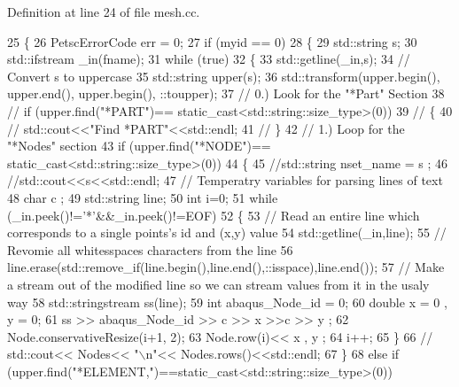 Definition at line 24 of file mesh.\+cc.


\begin{DoxyCode}
25 \{
26   PetscErrorCode err = 0;
27   \textcolor{keywordflow}{if} (myid == 0)
28   \{
29     std::string s;
30     std::ifstream \_in(fname);
31     \textcolor{keywordflow}{while} (\textcolor{keyword}{true})
32     \{
33       std::getline(\_in,s);
34       \textcolor{comment}{// Convert s to uppercase}
35       std::string upper(s);
36       std::transform(upper.begin(), upper.end(), upper.begin(), ::toupper);
37       \textcolor{comment}{// 0.) Look for the "*Part" Section}
38 \textcolor{comment}{//      if (upper.find("*PART")== static\_cast<std::string::size\_type>(0))}
39 \textcolor{comment}{//      \{}
40 \textcolor{comment}{//        std::cout<<"Find *PART"<<std::endl;}
41 \textcolor{comment}{//      \}}
42       \textcolor{comment}{// 1.) Loop for the "*Nodes" section}
43       \textcolor{keywordflow}{if} (upper.find(\textcolor{stringliteral}{"*NODE"})== \textcolor{keyword}{static\_cast<}std::string::size\_type\textcolor{keyword}{>}(0))
44       \{
45         \textcolor{comment}{//std::string nset\_name = s ;}
46         \textcolor{comment}{//std::cout<<s<<std::endl;}
47         \textcolor{comment}{// Temperatry variables for parsing lines of text}
48         \textcolor{keywordtype}{char} c ;
49         std::string line;
50         \textcolor{keywordtype}{int} i=0;
51         \textcolor{keywordflow}{while} (\_in.peek()!=\textcolor{charliteral}{'*'}&&\_in.peek()!=EOF)
52         \{
53           \textcolor{comment}{// Read an entire line which corresponds to a single points's id and (x,y) value}
54           std::getline(\_in,line);
55           \textcolor{comment}{// Revomie all whitesspaces characters from the line}
56           line.erase(std::remove\_if(line.begin(),line.end(),::isspace),line.end());
57           \textcolor{comment}{// Make a stream out of the modified line so we can stream values from it in the usaly way}
58           std::stringstream ss(line);
59           \textcolor{keywordtype}{int} abaqus\_Node\_id = 0;
60           \textcolor{keywordtype}{double} x = 0 , y = 0;
61           ss >> abaqus\_Node\_id >> c >> x >>c >> y ;
62           Node.conservativeResize(i+1, 2);
63           Node.row(i)<< x , y ;
64           i++;
65         \}
66         \textcolor{comment}{//  std::cout<< Nodes<< "\(\backslash\)n"<< Nodes.rows()<<std::endl;}
67       \}
68       \textcolor{keywordflow}{else} \textcolor{keywordflow}{if} (upper.find(\textcolor{stringliteral}{"*ELEMENT,"})==\textcolor{keyword}{static\_cast<}std::string::size\_type\textcolor{keyword}{>}(0))

\end{DoxyCode}
